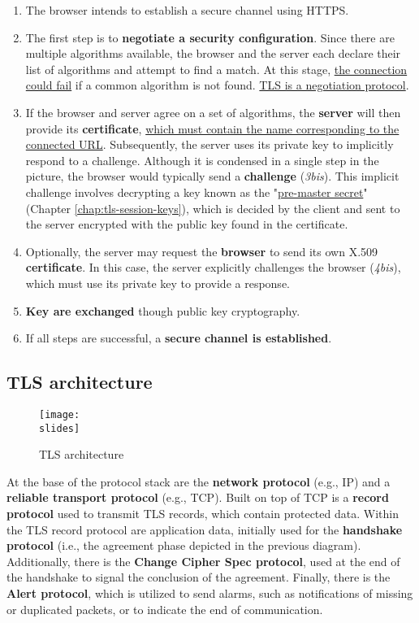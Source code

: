 \begin{enumerate}
    \item The browser intends to establish a secure channel using HTTPS.
    \item The first step is to \textbf{negotiate a security configuration}. Since there are multiple algorithms available, the browser and the server each declare their list of algorithms and attempt to find a match. At this stage, \ul{the connection could fail} if a common algorithm is not found. \ul{TLS is a negotiation protocol}.
    \item If the browser and server agree on a set of algorithms, the \textbf{server} will then provide its \textbf{certificate}, \ul{which must contain the name corresponding to the connected URL}. Subsequently, the server uses its private key to implicitly respond to a challenge. Although it is condensed in a single step in the picture, the browser would typically send a \textbf{challenge} (\textit{3bis}). This implicit challenge involves decrypting a key known as the "\ul{pre-master secret}" (Chapter \ref{chap:tls-session-keys}), which is decided by the client and sent to the server encrypted with the public key found in the certificate.
    \item Optionally, the server may request the \textbf{browser} to send its own X.509 \textbf{certificate}. In this case, the server explicitly challenges the browser (\textit{4bis}), which must use its private key to provide a response.
    \item \textbf{Key are exchanged} though public key cryptography.
    \item If all steps are successful, a \textbf{secure channel is established}.
\end{enumerate}


\subsection{TLS architecture}
\begin{figure}[h]
    \centering
    \texttt{[image: \\slides]}
    \caption{TLS architecture}
    \label{fig:tls-architecture}
\end{figure}

At the base of the protocol stack are the \textbf{network protocol} (e.g., IP) and a \textbf{reliable transport protocol} (e.g., TCP). Built on top of TCP is a \textbf{record protocol} used to transmit TLS records, which contain protected data. Within the TLS record protocol are application data, initially used for the \textbf{handshake protocol} (i.e., the agreement phase depicted in the previous diagram). Additionally, there is the \textbf{Change Cipher Spec protocol}, used at the end of the handshake to signal the conclusion of the agreement. Finally, there is the \textbf{Alert protocol}, which is utilized to send alarms, such as notifications of missing or duplicated packets, or to indicate the end of communication.


